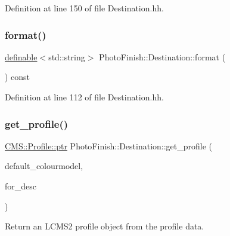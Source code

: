 Definition at line 150 of file Destination.\+hh.

\mbox{\label{class_photo_finish_1_1_destination_ac3e539fafa18892508dfb98cf68f29db}} 
\subsubsection{\texorpdfstring{format()}{format()}}
{\footnotesize\ttfamily \hyperlink{class_photo_finish_1_1definable}{definable}$<$std\+::string$>$ Photo\+Finish\+::\+Destination\+::format (\begin{DoxyParamCaption}\item[{void}]{ }\end{DoxyParamCaption}) const\hspace{0.3cm}{\ttfamily [inline]}}



Definition at line 112 of file Destination.\+hh.

\mbox{\label{class_photo_finish_1_1_destination_ae55bd5f0875ee3c7ce0bba1e5eb115b2}} 
\subsubsection{\texorpdfstring{get\+\_\+profile()}{get\_profile()}}
{\footnotesize\ttfamily \hyperlink{class_c_m_s_1_1_profile_a7d5a80e1317d17dbfdf5ae69820ab08b}{C\+M\+S\+::\+Profile\+::ptr} Photo\+Finish\+::\+Destination\+::get\+\_\+profile (\begin{DoxyParamCaption}\item[{\hyperlink{namespace_c_m_s_a9cb18b5da51a22c3c9dd25a5c9048e42}{C\+M\+S\+::\+Colour\+Model}}]{default\+\_\+colourmodel,  }\item[{std\+::string}]{for\+\_\+desc }\end{DoxyParamCaption})}



Return an L\+C\+M\+S2 profile object from the profile data. 



